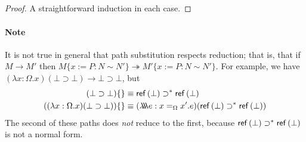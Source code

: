 \begin{lm}
\begin{enumerate}
\begin{code}
\\
\>[12]\<[22]%
\>[22]                    \<%
\\
%
\\
\>  \AgdaSymbol{:}  \AgdaSymbol{\{} \AgdaSymbol{\}} \AgdaSymbol{(} \AgdaSymbol{:}  \AgdaSymbol{)} \AgdaSymbol{\{}   \AgdaSymbol{:}   \AgdaSymbol{\}} \AgdaSymbol{\{} \AgdaSymbol{:}   \AgdaSymbol{\}} \<%
\\
\>[12]\<[22]%
\>[22]                    \<%
\end{code}
\end{enumerate}
\end{lm}

\begin{proof}
A straightforward induction in each case.
\end{proof}

\paragraph{Note}
It is not true in general that path substitution respects reduction; that is, that if $M \rightarrow M'$ then $M \{ x:=P : N \sim N' \} \twoheadrightarrow M' \{ x:=P : N \sim N' \}$.  For example, we have
$(\lambda x:\Omega.x)(\bot \supset \bot) \rightarrow \bot \supset \bot$,
but
\begin{align*}
(\bot \supset \bot) \{ \} & \equiv \mathsf{ref} \left( {\bot} \right) \supset^* \mathsf{ref} \left( {\bot} \right) \\
((\lambda x:\Omega.x)(\bot \supset \bot)) \{ \} & \equiv (\lambda \!\! \lambda \!\! \lambda e:x =_\Omega x'.e)(\mathsf{ref} \left( {\bot} \right) \supset^* \mathsf{ref} \left( {\bot} \right))
\end{align*}
The second of these paths does \emph{not} reduce to the first, because $\mathsf{ref} \left( {\bot} \right) \supset^* \mathsf{ref} \left( {\bot} \right)$ is not a normal form.


